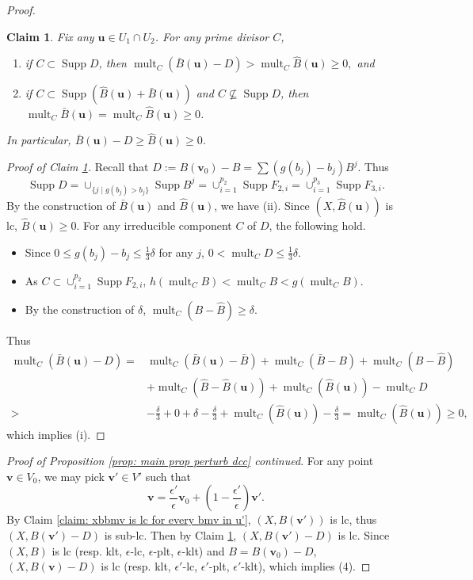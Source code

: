 \documentclass[11pt]{amsart}
\numberwithin{equation}{section}
\newcommand{\Supp}{\operatorname{Supp}}
\newcommand{\mult}{\operatorname{mult}}
\newtheorem{claim}[thm]{Claim}
\theoremstyle{definition}
\theoremstyle{definition}
\begin{document}
\begin{proof}
\begin{claim}\label{claim: in u1capu2 bbmu-dgeqtilde bbmugeq 0}
Fix any $\bm{u}\in U_1\cap U_2$. For any prime divisor $C$,
\begin{enumerate}
    \item[(i)] if $C\subset \Supp D$, then $\mult_C(\bar B(\bm{u})-D)>\mult_C\widehat B(\bm{u})\geq 0,$ and
    \item[(ii)] if $C\subset\Supp(\widehat B(\bm{u})+\bar B(\bm{u}))$ and $C\nsubseteq \Supp D$, then $\mult_C\bar B(\bm{u})=\mult_C\widehat B(\bm{u})\ge0$.
\end{enumerate}
In particular, $\bar B(\bm{u})-D\geq\widehat B(\bm{u})\geq 0$.
\end{claim}
\begin{proof}[Proof of Claim \ref{claim: in u1capu2 bbmu-dgeqtilde bbmugeq 0}]
Recall that $D:=B(\bm{v}_0)-B=\sum (g(b_j)-b_j)B^j$. Thus
$$\Supp D=\cup_{\{j\mid g(b_j)>b_j\}}\Supp B^j=\cup_{i=1}^{p_2}\Supp F_{2,i}=\cup_{i=1}^{p_3}\Supp F_{3,i}.$$
By the construction of $\bar B(\bm{u})$ and $\widehat B(\bm{u})$, we have (ii). Since $(X,\widehat B(\bm{u}))$ is lc, $\widehat B(\bm{u})\geq 0$. For any irreducible component $C$ of $D$, the following hold.
\begin{itemize}
  \item Since $0\leq g(b_j)-b_j\leq\frac{1}{3}\delta$ for any $j$, $0<\mult_CD\leq\frac{1}{3}\delta$.
  \item As $C\subset\cup_{i=1}^{p_2}\Supp F_{2,i}$, $h(\mult_CB)<\mult_CB<g(\mult_CB).$
  \item By the construction of $\delta$, $\mult_C(B-\widehat B)\geq\delta$.
\end{itemize}
Thus 
\begin{align*}
    \mult_C(\bar B(\bm{u})-D)=&\mult_C(\bar B(\bm{u})-\bar B)+\mult_C(\bar B-B)+\mult_C(B-\widehat B)\\
    &+\mult_C(\widehat B-\widehat B(\bm{u}))+\mult_C(\widehat B(\bm{u}))-\mult_CD\\
    >&-\frac{\delta}{3}+0+\delta-\frac{\delta}{3}+\mult_C(\widehat B(\bm{u}))-\frac{\delta}{3}
    =\mult_C(\widehat B(\bm{u}))\geq 0,
\end{align*}
which implies (i).
\end{proof}

\noindent\textit{Proof of Proposition \ref{prop: main prop perturb dcc} continued}. 
For any point $\bm{v}\in V_0$, we may pick $\bm{v}'\in V'$ such that
$$\bm{v}=\frac{\epsilon'}{\epsilon}\bm{v}_0+(1-\frac{\epsilon'}{\epsilon})\bm{v}'.$$
By Claim \ref{claim: xbbmv is lc for every bmv in u'}, $(X,B(\bm{v}'))$ is lc, thus $(X,B(\bm{v}')-D)$ is sub-lc. Then by Claim \ref{claim: in u1capu2 bbmu-dgeqtilde bbmugeq 0}, $(X,B(\bm{v}')-D)$ is lc. Since $(X,B)$ is lc (resp. klt, $\epsilon$-lc, $\epsilon$-plt, $\epsilon$-klt) and $B=B(\bm{v}_0)-D$, $(X,B(\bm{v})-D)$ is lc (resp. klt, $\epsilon'$-lc, $\epsilon'$-plt, $\epsilon'$-klt), which implies (4).


\end{proof}
\end{document}
